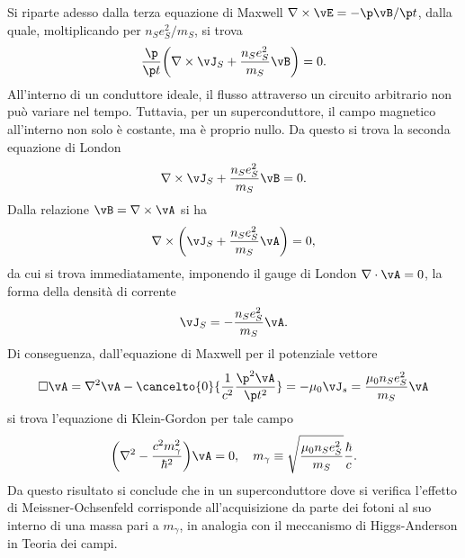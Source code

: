 Si riparte adesso dalla terza equazione di Maxwell $\nabla \times \vE = -\p\vB/\p t$, dalla quale, moltiplicando per $n_Se^2_S/m_S$, si trova
\begin{equation}
    \frac{\p}{\p t}\bigg(\nabla \times \vJ_S + \frac{n_Se_S^2}{m_S}\vB\bigg) = 0.
\end{equation}
All'interno di un conduttore ideale, il flusso attraverso un circuito arbitrario non può variare nel tempo. Tuttavia, per un superconduttore, il campo magnetico all'interno non solo è costante, ma è proprio nullo. Da questo si trova la seconda equazione di London
\begin{equation}
\label{eq: II equazione di London}
    \nabla \times \vJ_S + \frac{n_Se_S^2}{m_S}\vB = 0.
\end{equation}
Dalla relazione $\vB = \nabla \times \vA$ si ha 
\begin{equation}
    \nabla \times \bigg(\vJ_S + \frac{n_Se_S^2}{m_S}\vA\bigg) = 0,
\end{equation}
da cui si trova immediatamente, imponendo il gauge di London $\nabla \cdot \vA = 0$, la forma della densità di corrente 
\begin{equation}
    \vJ_S = -\frac{n_Se_S^2}{m_S}\vA.
\end{equation}
Di conseguenza, dall'equazione di Maxwell per il potenziale vettore
\begin{equation}
    \square\vA = \nabla^2\vA - \cancelto{0}{\frac{1}{c^2}\frac{\p^2\vA}{\p t^2}} = -\mu_0\vJ_s = \frac{\mu_0n_Se_S^2}{m_S}\vA
\end{equation}
si trova l'equazione di Klein-Gordon per tale campo
\begin{equation}
    \bigg(\nabla^2 - \frac{c^2m_\gamma^2}{\hbar^2}\bigg)\vA = 0,\quad m_\gamma \equiv \sqrt{\frac{\mu_0n_Se_S^2}{m_S}}\frac{\hbar}{c}.
\end{equation}
Da questo risultato si conclude che in un superconduttore dove si verifica l'effetto di Meissner-Ochsenfeld corrisponde all'acquisizione da parte dei fotoni al suo interno di una massa pari a $m_\gamma$, in analogia con il meccanismo di Higgs-Anderson in Teoria dei campi. 

